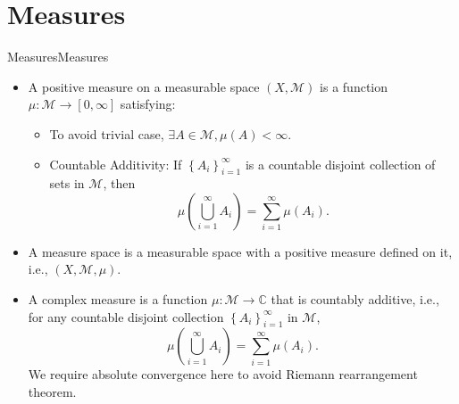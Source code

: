 \documentclass[../main.tex]{subfiles}
\begin{document}
\section{Measures}
\begin{definition}{Measures}{Measures}
	\begin{itemize}
	\item A positive measure on a measurable space $(X, \mathcal{M})$ is a function $\mu: \mathcal{M} \rightarrow [0,\infty ]$ satisfying:
		\begin{itemize}
		\item To avoid trivial case, $\exists A\in \mathcal{M}, \mu(A) < \infty $.
		\item Countable Additivity: If $\left\{ A_i \right\}_{i=1}^{\infty }$ is a countable disjoint collection of sets in $\mathcal{M}$, then
			\begin{equation}
			\mu\left(\bigcup_{i=1}^{\infty } A_i\right) = \sum_{i=1}^{\infty } \mu(A_i).
			\end{equation}
		\end{itemize}
	\item A measure space is a measurable space with a positive measure defined on it, i.e., $(X, \mathcal{M}, \mu)$.
	\item A complex measure is a function $\mu: \mathcal{M} \rightarrow \mathbb{C}$ that is countably additive, i.e., for any countable disjoint collection $\left\{ A_i \right\}_{i=1}^{\infty }$ in $\mathcal{M}$,
		\begin{equation*}
		\mu\left(\bigcup_{i=1}^{\infty } A_i\right) = \sum_{i=1}^{\infty } \mu(A_i).
		\end{equation*}
	We require absolute convergence here to avoid Riemann rearrangement theorem.
	\end{itemize}
\end{definition}
\end{document}
